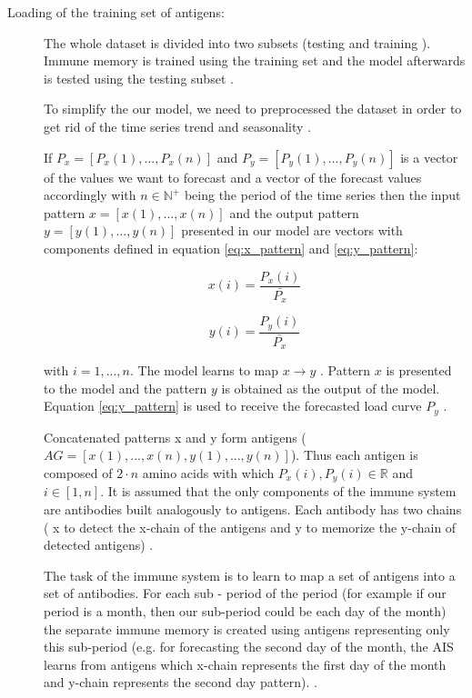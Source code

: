 \documentclass{assignment}
\begin{document}
\begin{description}
\item[Loading of the training set of antigens:] The whole dataset is divided into two subsets (te\-sting and training ). Immune memory is trained using the training set and the model afterwards is tested using the testing subset \cite{AIS_STLF08}. 

To simplify the our model, we need to preprocessed the dataset in order to get rid of the time series trend and seasonality \cite{AIS_STLF08}. 

If $P_x = [ P_x(1), ... , P_x(n)]$ and $P_y = [ P_y(1), ... , P_y(n)]$ is a vector of the values we want to forecast and a vector of the forecast values accordingly with $n \in \mathbb{N}^+$ being the period of the time series then the input pattern $x = [ x(1), ... , x(n)]$ and the output pattern $y = [ y(1), ... , y(n)]$ presented in our model are vectors with components defined in equation \eqref{eq:x_pattern} and \eqref{eq:y_pattern}:

\begin{equation}
x(i) = \frac{P_x(i)}{\bar{P_x}}
\label{eq:x_pattern}
\end{equation}

\begin{equation}
y(i) = \frac{P_y(i)}{\bar{P_x}}
\label{eq:y_pattern}
\end{equation}

with $ i = 1, ... , n$. The model learns to map $x \rightarrow y$ . Pattern $x$ is presented to the model and the pattern $y$ is obtained as the output of the model. Equation \eqref{eq:y_pattern} is used to receive the forecasted load curve $P_y$ \cite{AIS_STLF08}.

Concatenated patterns x and y form antigens ($AG = [x(1), ... , x(n), y(1), ... , y(n)]$). Thus each antigen is composed of $2 \cdot n$ amino acids with which $P_x(i),P_y(i) \in \mathbb{R}$ and $i \in [1,n]$. It is assumed that the only components of the immune system are antibodies built analogously to antigens. Each antibody has two chains ( x to detect the x-chain of the antigens and y to memorize the y-chain of detected antigens) \cite{AIS_STLF08}.

The task of the immune system is to learn to map a set of antigens into a set of antibodies. For each sub - period of the period (for example if our period is a month, then our sub-period could be each day of the month) the separate immune memory is created using antigens representing only this sub-period (e.g. for forecasting the second day of the month, the AIS learns from antigens which x-chain represents the first day of the month and y-chain represents the second day pattern).  \cite{AIS_STLF08}.


\end{description}
\end{document}
